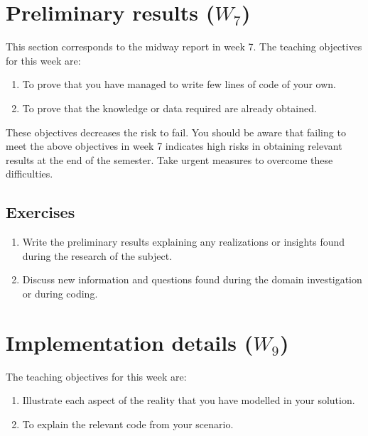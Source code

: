 \documentclass[a4paper,12pt]{report}
\begin{document}
\vspace{0.5cm}



\chapter{Preliminary results ($W_7$)}
This section corresponds to the midway report in week 7.
The teaching objectives for this week are:
\begin{enumerate}
 \item To prove that you have managed to write few lines of code of your own.
\item To prove that the knowledge or data required are already obtained.
\end{enumerate}

These objectives decreases the risk to fail. 
You should be aware that failing to meet the above objectives in week 
7 indicates high risks in obtaining relevant results at the end of the semester.
Take urgent measures to overcome these difficulties.


\section{Exercises}
\begin{enumerate}
\item Write the preliminary results explaining any realizations or insights found during the research of the subject.
\item Discuss new information and questions found during the domain investigation or during coding.
\end{enumerate}








\chapter{Implementation details ($W_9$)}

The teaching objectives for this week are:
\begin{enumerate}
 \item Illustrate each aspect of the reality that you have 
 modelled in your solution.
\item To explain the relevant code from your scenario.
\end{enumerate}
\end{document}
